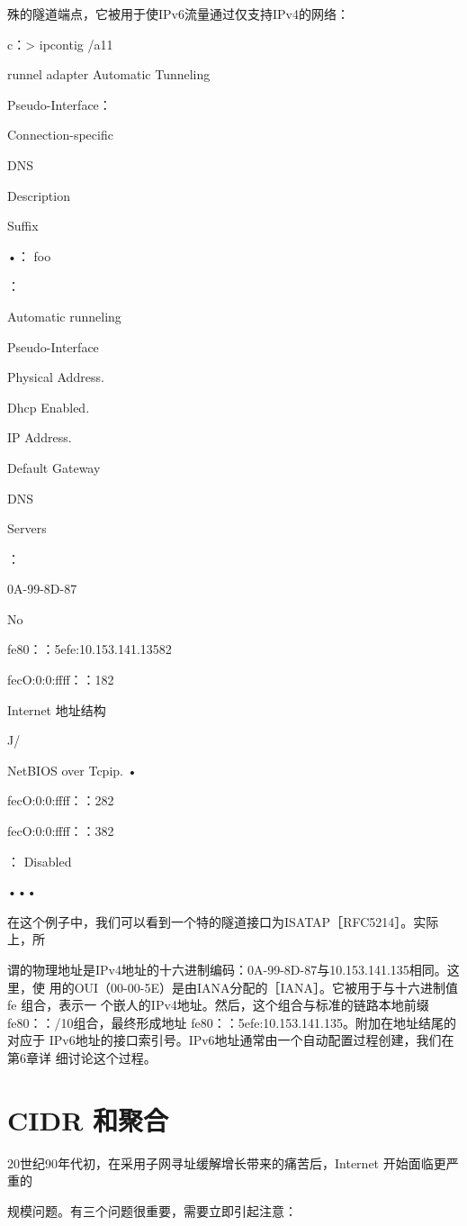 殊的隧道端点，它被用于使IPv6流量通过仅支持IPv4的网络：

c：> ipcontig /a11

runnel adapter Automatic Tunneling

Pseudo-Interface：

Connection-specific

DNS

Description

Suffix

•： foo

：

Automatic runneling

Pseudo-Interface

Physical Address.

Dhcp Enabled.

IP Address.

Default Gateway

DNS

Servers

：

0A-99-8D-87

No

fe80：：5efe:10.153.141.13582

fecO:0:0:ffff：：182

Internet 地址结构

J/

NetBIOS over Tcpip. •

fecO:0:0:ffff：：282

fecO:0:0:ffff：：382

： Disabled

•••

在这个例子中，我们可以看到一个特的隧道接口为ISATAP［RFC5214］。实际上，所

谓的物理地址是IPv4地址的十六进制编码：0A-99-8D-87与10.153.141.135相同。这里，使
用的OUI（00-00-5E）是由IANA分配的［IANA］。它被用于与十六进制值 fe 组合，表示一
个嵌人的IPv4地址。然后，这个组合与标准的链路本地前缀fe80：：/10组合，最终形成地址
fe80：：5efe:10.153.141.135。附加在地址结尾的%
对应于 IPv6地址的接口索引号。IPv6地址通常由一个自动配置过程创建，我们在第6章详
细讨论这个过程。

\section{CIDR 和聚合}
20世纪90年代初，在采用子网寻址缓解增长带来的痛苦后，Internet 开始面临更严重的

规模问题。有三个问题很重要，需要立即引起注意：

